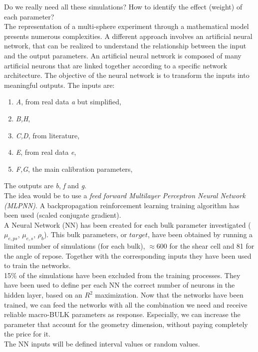 Do we really need all these simulations?
How to identify the effect (weight) of each parameter?\\
The representation of a multi-sphere experiment through a mathematical model presents numerous complexities.
A different approach involves an artificial neural network, that can be realized to understand the relationship between the input and the output parameters.
An artificial neural network is composed of many artificial neurons that are linked together according to a specific network architecture. The objective of the neural network is to transform the inputs into meaningful outputs.
The inputs are:
\begin{enumerate}
\item{\textit{A}, from real data \textit{a} but simplified,}
\item{\textit{B,H},}
\item{\textit{C,D}, from literature,}
\item{\textit{E}, from real data \textit{e},}
\item{\textit{F,G}, the main calibration parameters,}
\end{enumerate}
The outputs are \textit{b}, \textit{f} and \textit{g}.\\
The idea would be to use a \textit{feed forward Multilayer Perceptron Neural Network (MLPNN)}.
A backpropagation reinforcement learning training algorithm has been used (scaled conjugate gradient).\\
A Neural Network (NN) has been created for each bulk parameter investigated ($\mu_{e,ps}$, $\mu_{e,s}$, $\rho_{b}$).
This bulk parameters, or $target$, have been obtained by running a limited number of simulations (for each bulk), $\approx 600$ for the shear cell and 81 for the angle of repose.
Together with the corresponding inputs they have been used to train the networks.\\
15\% of the simulations have been excluded from the training processes.
They have been used to define per each NN the correct number of neurons in the hidden layer, based on an $R^2$ maximization.
Now that the networks have been trained, we can feed the networks with all the combination we need and receive reliable macro-BULK parameters as response.
Especially, we can increase the parameter that account for the geometry dimension, without paying completely the price for it.\\
The NN inputs will be defined interval values or random values.\\

